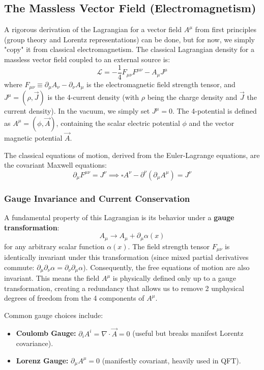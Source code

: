 \subsection{The Massless Vector Field (Electromagnetism)}

A rigorous derivation of the Lagrangian for a vector field \(A^\mu\) from first principles (group theory and Lorentz representations) can be done, but for now, we simply "copy" it from classical electromagnetism. The classical Lagrangian density for a massless vector field coupled to an external source is:
\[
    \mathcal{L} = -\frac{1}{4} F_{\mu\nu} F^{\mu\nu} - A_\mu J^\mu
\]
where \(F_{\mu\nu} \equiv \partial_\mu A_\nu - \partial_\nu A_\mu\) is the electromagnetic field strength tensor, and \(J^\mu = (\rho, \vec{J})\) is the 4-current density (with \(\rho\) being the charge density and \(\vec{J}\) the current density). In the vacuum, we simply set \(J^\mu = 0\). The 4-potential is defined as \(A^\mu = (\phi, \vec{A})\), containing the scalar electric potential \(\phi\) and the vector magnetic potential \(\vec{A}\).

The classical equations of motion, derived from the Euler-Lagrange equations, are the covariant Maxwell equations:
\[
    \partial_\mu F^{\mu\nu} = J^\nu \implies \square A^\nu - \partial^\nu (\partial_\mu A^\mu) = J^\nu
\]

\subsubsection*{Gauge Invariance and Current Conservation}

A fundamental property of this Lagrangian is its behavior under a \textbf{gauge transformation}:
\[
    A_\mu \to A_\mu + \partial_\mu \alpha(x)
\]
for any arbitrary scalar function \(\alpha(x)\). The field strength tensor \(F_{\mu\nu}\) is identically invariant under this transformation (since mixed partial derivatives commute: \(\partial_\mu \partial_\nu \alpha = \partial_\nu \partial_\mu \alpha\)). Consequently, the free equations of motion are also invariant. This means the field \(A^\mu\) is physically defined only up to a gauge transformation, creating a redundancy that allows us to remove 2 unphysical degrees of freedom from the 4 components of \(A^\mu\).

Common gauge choices include:
\begin{itemize}
    \item \textbf{Coulomb Gauge:} \(\partial_i A^i = \nabla \cdot \vec{A} = 0\) (useful but breaks manifest Lorentz covariance).
    \item \textbf{Lorenz Gauge:} \(\partial_\mu A^\mu = 0\) (manifestly covariant, heavily used in QFT).
\end{itemize}

